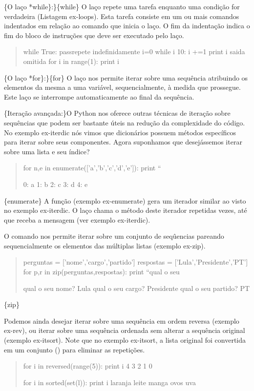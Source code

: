 \documentclass[a4paper,10pt,brazil]{sphinxmanual}
\begin{document}
\{O laço *while\}:\}\{while\} O laço  repete uma tarefa
enquanto uma condição for verdadeira (Listagem ex-loops). Esta
tarefa consiste em um ou mais comandos indentados em relação ao
comando que inicia o laço. O fim da indentação indica o fim do
bloco de instruções que deve ser executado pelo laço.
\begin{quote}

while True: passrepete indefinidamente i=0 while i 10: i +=1 print
i saida omitida for i in range(1): print i
\end{quote}

\{O laço *for\}:\}\{for\} O laço  nos permite iterar
sobre uma sequência atribuindo os elementos da mesma a uma
variável, sequencialmente, à medida que prossegue. Este laço se
interrompe automaticamente ao final da sequência.

\{Iteração avançada:\}O Python nos oferece outras técnicas de
iteração sobre sequências que podem ser bastante úteis na redução
da complexidade do código. No exemplo ex-iterdic nós vimos que
dicionários possuem métodos específicos para iterar sobre seus
componentes. Agora suponhamos que desejássemos iterar sobre uma
lista e seu índice?
\begin{quote}

for n,e in enumerate({[}'a','b','c','d','e'{]}): print ``

0: a 1: b 2: c 3: d 4: e
\end{quote}

\{enumerate\} A função  (exemplo ex-enumerate) gera um
iterador similar ao visto no exemplo ex-iterdic. O laço 
chama o método  deste iterador repetidas vezes, até que
receba a mensagem  (ver exemplo ex-iterdic).

O comando  nos permite iterar sobre um conjunto de
seqûencias pareando sequencialmente os elementos das múltiplas
listas (exemplo ex-zip).
\begin{quote}

perguntas = {[}'nome','cargo','partido'{]} respostas =
{[}'Lula','Presidente','PT'{]} for p,r in zip(perguntas,respostas):
print ``qual o seu

qual o seu nome? Lula qual o seu cargo? Presidente qual o seu
partido? PT
\end{quote}

\{zip\}

Podemos ainda desejar iterar sobre uma sequência em ordem reversa
(exemplo ex-rev), ou iterar sobre uma sequência ordenada sem
alterar a sequência original (exemplo ex-itsort). Note que no
exemplo ex-itsort, a lista original foi convertida em um conjunto
() para eliminar as repetições.
\begin{quote}

for i in reversed(range(5)): print i 4 3 2 1 0

for i in sorted(set(l)): print i laranja leite manga ovos uva
\end{quote}
\end{document}
